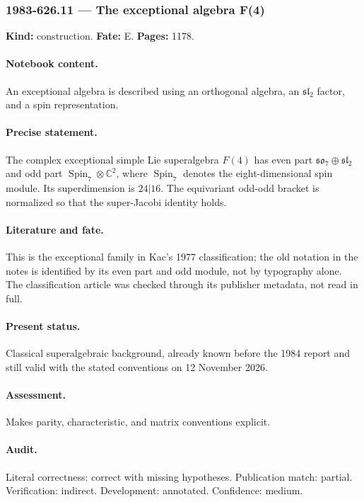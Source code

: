 \subsubsection{1983-626.11 --- The exceptional algebra F(4)}

\label{item:1983-626.11}

\noindent\textbf{Kind:} construction. \textbf{Fate:} E. \textbf{Pages:} 1178.\par

\paragraph{Notebook content.} An exceptional algebra is described using an orthogonal algebra, an \(\mathfrak{sl}_2\) factor, and a spin representation.

\paragraph{Precise statement.} The complex exceptional simple Lie superalgebra \(F(4)\) has even part \(\mathfrak{so}_7\oplus\mathfrak{sl}_2\) and odd part \(\operatorname{Spin}_7\otimes\mathbb C^2\), where \(\operatorname{Spin}_7\) denotes the eight-dimensional spin module. Its superdimension is \(24|16\). The equivariant odd-odd bracket is normalized so that the super-Jacobi identity holds.

\paragraph{Literature and fate.} This is the exceptional family in Kac’s 1977 classification; the old notation in the notes is identified by its even part and odd module, not by typography alone. The classification article was checked through its publisher metadata, not read in full.

\paragraph{Present status.} Classical superalgebraic background, already known before the 1984 report and still valid with the stated conventions on 12 November 2026.

\paragraph{Assessment.} Makes parity, characteristic, and matrix conventions explicit.

\paragraph{Audit.} Literal correctness: correct with missing hypotheses. Publication match: partial. Verification: indirect. Development: annotated. Confidence: medium.

